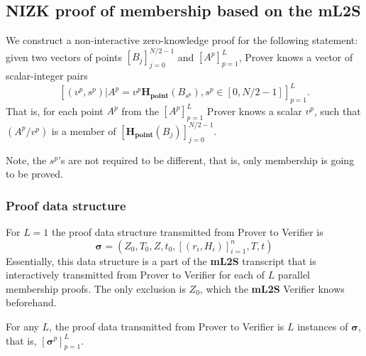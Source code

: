 \documentclass{mathcryptology} %
\newcommand{\Hpoint}{\textbf{H}_{\textbf{point}}}
\theoremstyle{title}
\theoremstyle{titleof}
\begin{document}
\subsection{NIZK proof of membership based on the mL2S}
    We construct a non-interactive zero-knowledge proof for the following statement: given two vectors of points ${\left[B_{j}\right]}_{j=0}^{N/2-1}$ and ${\left[A^{p}\right]}_{p=1}^{L}$, Prover knows a vector of scalar-integer pairs
    \begin{equation*}
        {\left[ \left(v^{p},s^{p}\right) |  A^{p} = v^{p} \Hpoint
        \left(B_{s^p}\right), s^{p} \in \left[0,N/2-1\right] \right]}_{p=1}^{L}.
    \end{equation*}
    That is, for each point $A^{p}$ from the ${\left[A^{p}\right]}_{p=1}^{L}$ Prover knows a scalar $v^{p}$, such that $\left(A^{p} / v^{p}\right)$ is a member of ${\left[\Hpoint\left(B_{j}\right)\right]}_{j=0}^{N/2-1}$.

    Note, the $s^{p}$'s are not required to be different, that is, only membership is going to be proved.


\subsubsection{Proof data structure}
    For $L=1$ the proof data structure transmitted from Prover to Verifier is
    \begin{equation*}
        \mathbf{\sigma} = \left(Z_{0}, T_{0}, Z, t_{0},
        {\left[\left(r_{i}, H_{i}\right)\right]}_{i=1}^n, T, t\right)
    \end{equation*}
    Essentially, this data structure is a part of the \textbf{mL2S} transcript that is interactively transmitted from Prover to Verifier for each of $L$ parallel membership proofs. The only exclusion is $Z_{0}$, which the \textbf{mL2S} Verifier knows beforehand.

    For any $L$, the proof data transmitted from Prover to Verifier is $L$ instances of $\mathbf{\sigma}$, that is, ${\left[\mathbf{\sigma}^{p}\right]}_{p=1}^{L}$.


\end{document}
